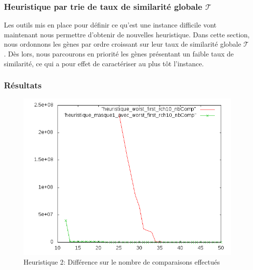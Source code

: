\documentclass[a4paper,12pt]{article}
\begin{document}
\subsubsection{Heuristique par trie de taux de similarité globale $\mathcal{T}$ }
Les outils mis en place pour définir ce qu'est une instance difficile vont maintenant nous permettre d'obtenir de nouvelles heuristique. Dans cette section, nous ordonnons les gènes par ordre croissant sur leur taux de similarité globale $\mathcal{T}$. Dès lors, nous parcourons en priorité les gènes présentant un faible taux de similarité, ce qui a pour effet de caractériser au plus tôt l'instance.

\subsubsection*{Résultats}
\begin{figure}[H]
\begin{center}
\includegraphics[scale=0.6]{./graphique/diff2_nbComp.png}
\end{center}
\caption{Heuristique 2: Différence sur le nombre de comparaisons effectués}
\end{figure}
\end{document}
